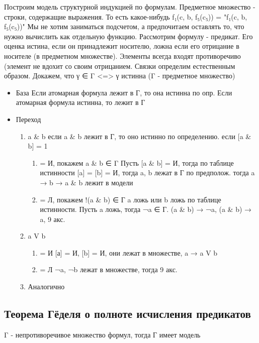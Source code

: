 \documentclass[11pt]{article}
\begin{document}
Построим модель структурной индукцией по формулам.
Предметное множество - строки, содержащие выражения.
То есть какое-нибудь f₁(c, b, f₅(c₅)) = "f₁(c, b, f₅(c₅))"
Мы не хотим заниматься подсчетом, а предпочитаем оставлять
то, что нужно вычислить как отдельную функцию.
Рассмотрим формулу - предикат. Его оценка истина, если
он принадлежит носителю, ложна если его отрицание в носителе
(в предметном множестве).
Элементы всегда входят противоречиво (элемент не вдохит со
своим отрицанием.
Связки определим естественным образом.
Докажем, что γ ∈ Γ <=> γ истинна  (Γ - предметное множество)
\begin{itemize}
\item База
Если атомарная формула лежит в Г, то она истинна по опр.
Если атомарная формула истинна, то лежит в Г
\item Переход
\begin{enumerate}
\item a \& b
если a \& b лежит в Г, то оно истинно по определению.
если [a \& b] = 1
\begin{enumerate}
\item\relax [a \& b] = И, покажем a \& b ∈ Γ
Пусть [a \& b] = И, тогда по таблице истинности
[a] = [b] = И, тогда a, b лежат в Г по предполож.
тогда a → b → a \& b лежит в модели
\item\relax [a \& b] = Л, покажем !(a \& b) ∈ Г
a ложь или b ложь по таблице истинности. Пусть
a ложь, тогда
¬a ∈ Г. (a \& b) → ¬a, (a \& b) → a, 9 акс.
\end{enumerate}
\item a V b
\begin{enumerate}
\item\relax [a V b] = И
[а] = И, [b] = И, они лежат в множестве, a → a V b
\item\relax [a V b] = Л
¬a, ¬b лежат в множестве, тогда 9 акс.
\end{enumerate}
\item Аналогично
\end{enumerate}
\end{itemize}
\subsection{Теорема Гёделя о полноте исчисления предикатов}
\label{sec-8-7}
Γ - непротиворечивое множество формул, тогда Г имеет модель
\end{document}
